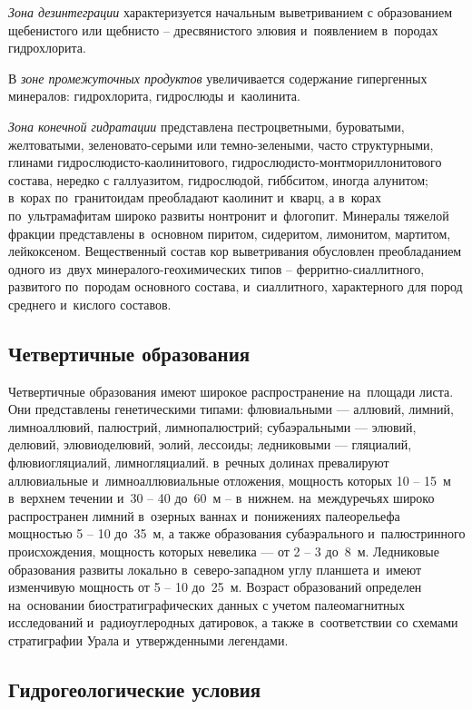 \textit{Зона дезинтеграции} характеризуется начальным выветриванием с образованием щебенистого или щебнисто -- дресвянистого элювия и~появлением в~породах гидрохлорита. 

В \textit{зоне промежуточных продуктов} увеличивается содержание гипергенных минералов: гидрохлорита, гидрослюды и~каолинита. 

\textit{Зона конечной гидратации} представлена пестроцветными, буроватыми, желтоватыми, зеленовато-серыми или темно-зелеными, часто структурными, глинами гидро\-слюдисто-каолинитового, гидрослюдисто-монтмориллонитового состава, нередко с галлуазитом, гидрослюдой, гиббситом, иногда алунитом; в~корах по~гранитоидам преобладают каолинит и~кварц, а в~корах по~ультрамафитам широко развиты нонтронит и~флогопит. Минералы тяжелой фракции представлены в~основном пиритом, сидеритом, лимонитом, мартитом, лейкоксеном. Вещественный состав кор выветривания обусловлен преобладанием одного из~двух минералого-геохимических типов  --  ферритно-сиаллитного, развитого по~породам основного состава, и~сиаллитного, характерного для пород среднего и~кислого составов.

\subsection*{Четвертичные образования}
Четвертичные образования имеют широкое распространение на~площади листа. Они представлены генетическими типами: флювиальными --- аллювий, лимний, лимноаллювий, палюстрий, лимнопалюстрий; субаэральными --- элювий, делювий, элювиоделювий, эолий, лессоиды; ледниковыми --- гляциалий, флювиогляциалий, лимногляциалий. в~речных долинах превалируют аллювиальные и~лимноаллювиальные отложения, мощность которых 10 -- 15~м в~верхнем течении и~30 -- 40 до~60~м -- в~нижнем. на~междуречьях широко распространен лимний в~озерных ваннах и~понижениях палеорельефа мощностью 5 -- 10 до~35~м, а также образования субаэрального и~палюстринного происхождения, мощность которых невелика --- 
от 2 -- 3 до~8~м. Ледниковые образования развиты локально в~северо-западном углу планшета и~имеют изменчивую мощность от 5 -- 10 до~25~м.
Возраст образований определен на~основании биостратиграфических данных с учетом палеомагнитных исследований и~радиоуглеродных датировок, а также в~соответствии со схемами стратиграфии Урала и~утвержденными легендами.

\subsection*{Гидрогеологические условия}
%
\hydrogeology

